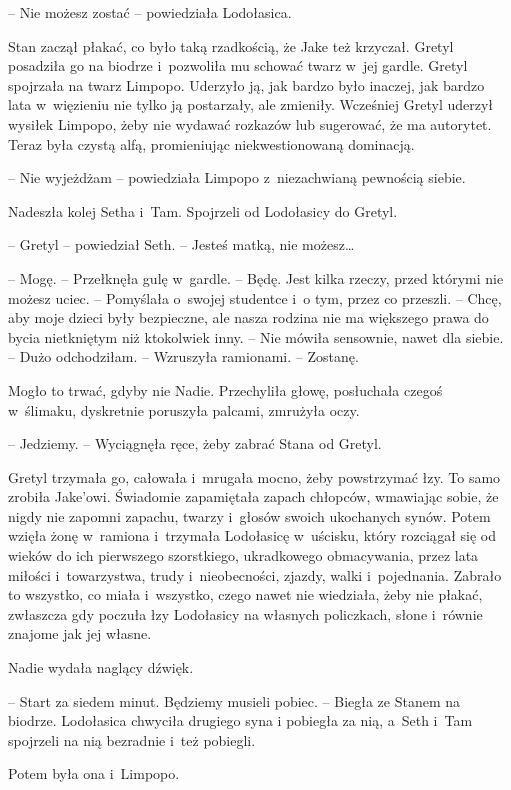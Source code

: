 \documentclass[oneside,polish,11pt,sfheadings]{mwbk}
\begin{document}
-- Nie możesz zostać -- powiedziała Lodołasica. 

Stan zaczął płakać, co
było taką rzadkością, że Jake też krzyczał. Gretyl posadziła go na
biodrze i~pozwoliła mu schować twarz w~jej gardle. Gretyl spojrzała na
twarz Limpopo. Uderzyło ją, jak bardzo było inaczej, jak bardzo lata w~więzieniu nie tylko ją postarzały, ale zmieniły. Wcześniej Gretyl
uderzył wysiłek Limpopo, żeby nie wydawać rozkazów lub sugerować, że ma
autorytet. Teraz była czystą alfą, promieniując niekwestionowaną
dominacją.

-- Nie wyjeżdżam -- powiedziała Limpopo z~niezachwianą pewnością siebie.

Nadeszła kolej Setha i~Tam. Spojrzeli od Lodołasicy do Gretyl. 

-- Gretyl -- powiedział Seth. -- Jesteś matką, nie możesz\ldots 

-- Mogę. -- Przełknęła gulę w~gardle. -- Będę. Jest kilka rzeczy, przed
którymi nie możesz uciec. -- Pomyślała o~swojej studentce i~o tym, przez
co przeszli. -- Chcę, aby moje dzieci były bezpieczne, ale nasza rodzina
nie ma większego prawa do bycia nietkniętym niż ktokolwiek inny. -- Nie
mówiła sensownie, nawet dla siebie. -- Dużo odchodziłam. -- Wzruszyła
ramionami. -- Zostanę.

Mogło to trwać, gdyby nie Nadie. Przechyliła głowę, posłuchała czegoś w~ślimaku, dyskretnie poruszyła palcami, zmrużyła oczy. 

-- Jedziemy. -- Wyciągnęła ręce, żeby zabrać Stana od Gretyl. 

Gretyl trzymała go,
całowała i~mrugała mocno, żeby powstrzymać łzy. To samo zrobiła
Jake'owi. Świadomie zapamiętała zapach chłopców, wmawiając sobie, że
nigdy nie zapomni zapachu, twarzy i~głosów swoich ukochanych synów.
Potem wzięła żonę w~ramiona i~trzymała Lodołasicę w~uścisku, który
rozciągał się od wieków do ich pierwszego szorstkiego, ukradkowego
obmacywania, przez lata miłości i~towarzystwa, trudy i~nieobecności,
zjazdy, walki i~pojednania. Zabrało to wszystko, co miała i~wszystko,
czego nawet nie wiedziała, żeby nie płakać, zwłaszcza gdy poczuła łzy
Lodołasicy na własnych policzkach, słone i~równie znajome jak jej
własne.

Nadie wydała naglący dźwięk. 

-- Start za siedem minut. Będziemy musieli
pobiec. -- Biegła ze Stanem na biodrze. Lodołasica chwyciła drugiego syna
i pobiegła za nią, a~Seth i~Tam spojrzeli na nią bezradnie i~też
pobiegli.

Potem była ona i~Limpopo.
\end{document}
